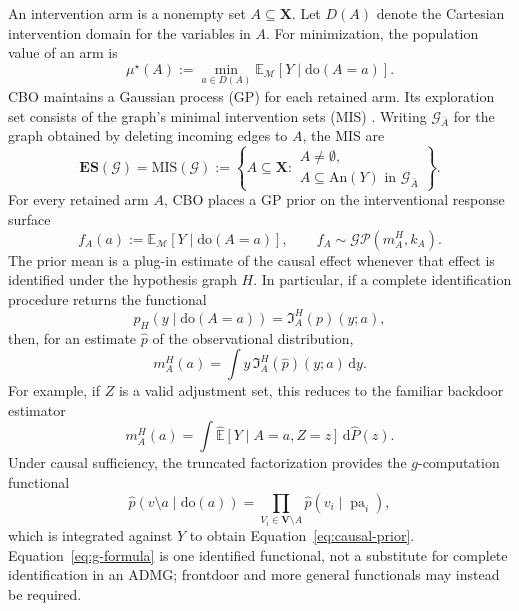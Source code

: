 \documentclass[twoside]{article}
\newcommand{\E}{\mathbb{E}}
\newcommand{\doo}{\mathrm{do}}
\newcommand{\An}{\mathrm{An}}
\newcommand{\Gg}{\mathcal{G}}
\newcommand{\ES}{\mathbf{ES}}
\begin{document}
An intervention arm is a nonempty set $A\subseteq\mathbf X$. Let $D(A)$
denote the Cartesian intervention domain for the variables in $A$. For
minimization,
the population value of an arm is
\begin{equation}
  \mu^\star(A):=\min_{a\in D(A)}
  \E_{\mathcal M}\!\left[Y\mid\doo(A=a)\right].
  \label{eq:arm-value}
\end{equation}
CBO maintains a Gaussian process (GP) for each retained arm. Its exploration
set consists of the graph's minimal intervention sets (MIS)
\citep{leeStructuralCausalBandits,agliettiCausalBayesianOptimization2020b}.
Writing $\Gg_{\bar A}$ for the graph obtained by deleting incoming edges to
$A$, the MIS are
\begin{equation}
  \ES(\Gg)=\mathrm{MIS}(\Gg)
  :=\left\{A\subseteq\mathbf X:
  \substack{A\ne\emptyset,\\
  A\subseteq\An(Y)\text{ in }\Gg_{\bar A}}\right\}.
  \label{eq:mis}
\end{equation}
For every retained arm $A$, CBO places a GP prior on the interventional
response surface
\begin{equation}
  f_A(a):=\E_{\mathcal M}[Y\mid\doo(A=a)],
  \qquad f_A\sim\mathcal{GP}(m_A^H,k_A).
  \label{eq:cbo-gp}
\end{equation}
The prior mean is a plug-in estimate of the causal effect whenever that
effect is identified under the hypothesis graph $H$. In particular, if a
complete identification procedure returns the functional
\begin{equation}
  p_H(y\mid\doo(A=a))=\mathfrak I_A^H(p)(y;a),
  \label{eq:id-functional}
\end{equation}
then, for an estimate $\widehat p$ of the observational distribution,
\begin{equation}
  m_A^H(a)=\int y\,\mathfrak I_A^H(\widehat p)(y;a)\,\mathrm dy.
  \label{eq:causal-prior}
\end{equation}
For example, if $Z$ is a valid adjustment set, this reduces to the familiar
backdoor estimator
\begin{equation}
  m_A^H(a)=\int \widehat{\E}[Y\mid A=a,Z=z]\,\mathrm d\widehat P(z).
  \label{eq:backdoor-prior}
\end{equation}
Under causal sufficiency, the truncated factorization provides the
$g$-computation functional
\begin{equation}
  \widehat p(v\setminus a\mid\doo(a))
  =\prod_{V_i\in\mathbf V\setminus A}
    \widehat p(v_i\mid\operatorname{pa}_i),
  \label{eq:g-formula}
\end{equation}
which is integrated against $Y$ to obtain Equation~\eqref{eq:causal-prior}.
Equation~\eqref{eq:g-formula} is one identified functional, not a substitute
for complete identification in an ADMG; frontdoor and more general
functionals may instead be required.
\end{document}
